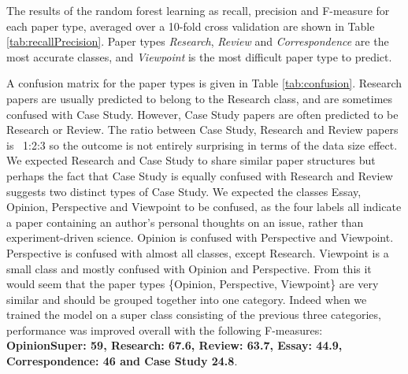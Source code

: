 \documentclass{svmult}
\begin{document}
The results of the random forest learning as recall, precision and F-measure
for each paper type, averaged over a 10-fold cross validation are shown in Table
\ref{tab:recallPrecision}. Paper types {\em Research}, {\em Review} and {\em
Correspondence} are the most accurate classes, and {\em Viewpoint} is the most
difficult paper type to predict. 


A confusion matrix for the paper types is given in Table
\ref{tab:confusion}. Research papers are usually predicted to belong
to the Research class, and are sometimes confused with Case
Study. However, Case Study papers are often predicted to be Research
or Review. The ratio between Case Study, Research and Review papers is
~1:2:3 so the outcome is not entirely surprising in terms of the data
size effect. We expected Research and Case Study to share similar
paper structures but perhaps the fact that Case Study is equally
confused with Research and Review suggests two distinct types of Case
Study.  We expected the classes Essay, Opinion, Perspective and
Viewpoint to be confused, as the four labels all indicate a paper
containing an author's personal thoughts on an issue, rather than
experiment-driven science. Opinion is confused with Perspective and
Viewpoint. Perspective is confused with almost all classes, except
Research. Viewpoint is a small class and mostly confused with Opinion
and Perspective. From this it would seem that the paper types
\{Opinion, Perspective, Viewpoint\} are very similar and should be
grouped together into one category. Indeed when we trained the model
on a super class consisting of the previous three categories,
performance was improved overall with the following F-measures:
{\bf OpinionSuper: 59, Research: 67.6, Review: 63.7, Essay: 44.9,
Correspondence: 46 and Case Study 24.8}.
\end{document}
